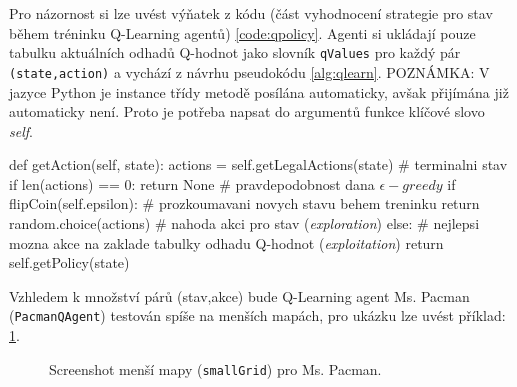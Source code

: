 Pro názornost si lze uvést výňatek z kódu (část vyhodnocení strategie pro stav během tréninku Q-Learning agentů) \ref{code:qpolicy}. Agenti si ukládají pouze tabulku aktuálních odhadů Q-hodnot jako slovník \texttt{qValues} pro každý pár \texttt{(state,action)} a vychází z návrhu pseudokódu \ref{alg:qlearn}.
\newline POZNÁMKA: V jazyce Python je instance třídy metodě posílána automaticky, avšak přijímána již automaticky není. Proto je potřeba napsat do argumentů funkce klíčové slovo \textit{self}.

\begin{python}[label={code:qpolicy}]
def getAction(self, state):
   actions = self.getLegalActions(state)
   # terminalni stav
   if len(actions) == 0:
      return None
   # pravdepodobnost dana $\epsilon-greedy$ 
   if flipCoin(self.epsilon):
      # prozkoumavani novych stavu behem treninku
      return random.choice(actions) # nahoda akci pro stav (\textit{exploration})
   else:
      # nejlepsi mozna akce na zaklade tabulky odhadu Q-hodnot (\textit{exploitation})
      return self.getPolicy(state)
\end{python}

Vzhledem k množství párů (stav,akce) bude Q-Learning agent Ms. Pacman (\texttt{PacmanQAgent}) testován spíše na menších mapách, pro ukázku lze uvést příklad: \ref{img:smallL}.
\begin{figure}[!htbp]
\begin{center}
  \caption{Screenshot menší mapy (\texttt{smallGrid}) pro Ms. Pacman.}
  \label{img:smallL}
\end{center}
\end{figure}


